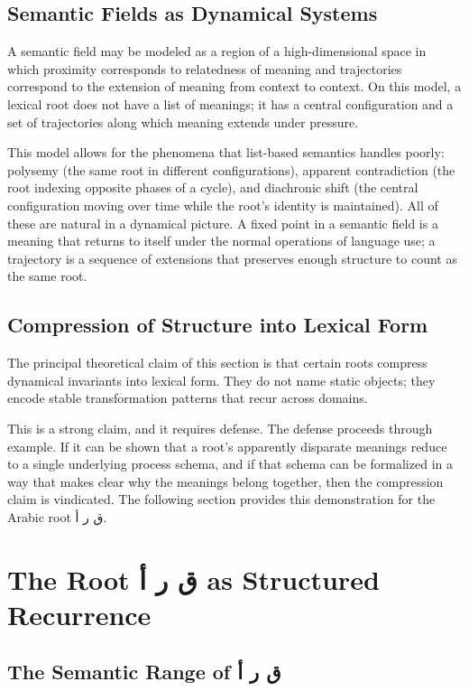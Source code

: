\documentclass[12pt, oneside]{article}
\newcommand{\AR}[1]{\textarabic{#1}}
\theoremstyle{definition}
\theoremstyle{remark}
\begin{document}
\subsection{Semantic Fields as Dynamical Systems}

A semantic field may be modeled as a region of a high-dimensional space in which proximity corresponds to relatedness of meaning and trajectories correspond to the extension of meaning from context to context.
On this model, a lexical root does not have a list of meanings; it has a central configuration and a set of trajectories along which meaning extends under pressure.

This model allows for the phenomena that list-based semantics handles poorly: polysemy (the same root in different configurations), apparent contradiction (the root indexing opposite phases of a cycle), and diachronic shift (the central configuration moving over time while the root's identity is maintained).
All of these are natural in a dynamical picture.
A fixed point in a semantic field is a meaning that returns to itself under the normal operations of language use; a trajectory is a sequence of extensions that preserves enough structure to count as the same root.

\subsection{Compression of Structure into Lexical Form}

The principal theoretical claim of this section is that certain roots compress dynamical invariants into lexical form.
They do not name static objects; they encode stable transformation patterns that recur across domains.

This is a strong claim, and it requires defense.
The defense proceeds through example.
If it can be shown that a root's apparently disparate meanings reduce to a single underlying process schema, and if that schema can be formalized in a way that makes clear why the meanings belong together, then the compression claim is vindicated.
The following section provides this demonstration for the Arabic root \AR{ق ر أ}.

\section{The Root \AR{ق ر أ} as Structured Recurrence}

\subsection{The Semantic Range of \AR{ق ر أ}}
\end{document}
